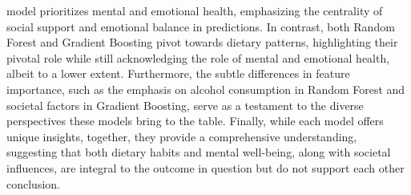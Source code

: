 			model
			prioritizes mental and emotional health, emphasizing the centrality of social support and emotional
			balance in
			predictions. In contrast, both Random Forest and Gradient Boosting pivot towards dietary patterns,
			highlighting
			their pivotal role while still acknowledging the role of mental and emotional health, albeit to a lower
			extent.
			Furthermore, the subtle differences in feature importance, such as the emphasis on alcohol consumption in
			Random Forest and societal factors in Gradient Boosting, serve as a testament to the diverse perspectives
			these models bring to the table. Finally, while each model offers unique insights, together, they provide a
			comprehensive understanding, suggesting that both dietary habits and mental well-being, along with societal
			influences, are integral to the outcome in question but do not support each other conclusion.
